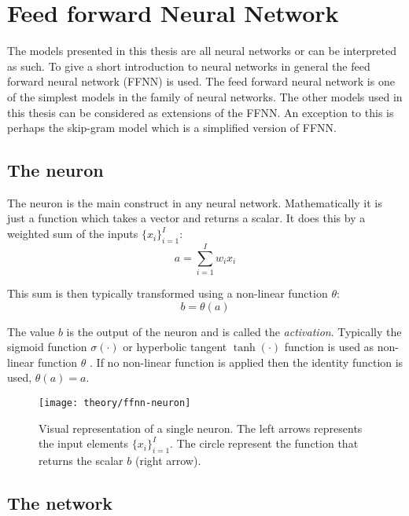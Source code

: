 
\section{Feed forward Neural Network}
\label{sec:theory:ffnn}

The models presented in this thesis are all neural networks or can be interpreted as such. To give a short introduction to neural networks in general the feed forward neural network (FFNN) is used. The feed forward neural network is one of the simplest models in the family of neural networks. The other models used in this thesis can be considered as extensions of the FFNN. An exception to this is perhaps the skip-gram model which is a simplified version of FFNN.

\subsection{The neuron}

The neuron is the main construct in any neural network. Mathematically it is just a function which takes a vector and returns a scalar. It does this by a weighted sum of the inputs $\{ x_i \}_{i=1}^I$:
\begin{equation}
a = \sum_{i=1}^I w_{i} x_i
\end{equation}

This sum is then typically transformed using a non-linear function $\theta$:
\begin{equation}
b = \theta(a)
\end{equation}

The value $b$ is the output of the neuron and is called the \textit{activation}. Typically the sigmoid function $\sigma(\cdot)$ or hyperbolic tangent $\tanh(\cdot)$ function is used as non-linear function $\theta$ \cite{bishop}. If no non-linear function is applied then the identity function is used, $\theta(a) = a$.

\begin{figure}[H]
	\centering
	\texttt{[image: theory/ffnn-neuron]}
	\caption{Visual representation of a single neuron. The left arrows represents the input elements $\{ x_i \}_{i=1}^I$. The circle represent the function that returns the scalar $b$ (right arrow).}
\end{figure}

\subsection{The network}

